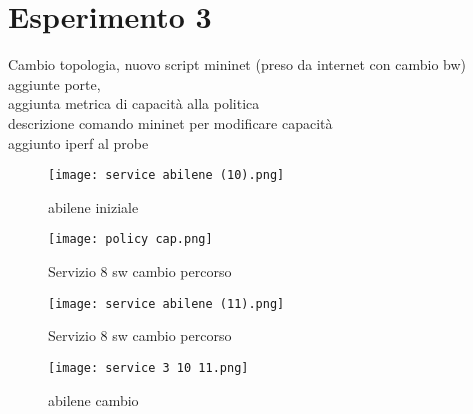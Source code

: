 \section{Esperimento 3}
Cambio topologia, nuovo script mininet (preso da internet con cambio bw)
\\ aggiunte porte,
\\aggiunta metrica di capacità alla politica
\\descrizione comando mininet per modificare capacità
\\aggiunto iperf al probe
\begin{figure}[h]
    \centering
   \texttt{[image: service abilene (10).png]}
    \caption{abilene iniziale}
    \label{fig:abilene}
\end{figure}

\begin{figure}[h]
    \centering
   \texttt{[image: policy cap.png]}
    \caption{Servizio 8 sw cambio percorso}
    \label{fig:policy cap}
\end{figure}

\begin{figure}[h]
    \centering
   \texttt{[image: service abilene (11).png]}
    \caption{Servizio 8 sw cambio percorso}
    \label{fig:abilene dopo}
\end{figure}

\begin{figure}[h]
    \centering
   \texttt{[image: service 3 10 11.png]}
    \caption{abilene cambio }
    \label{fig:abilene post}
\end{figure}


